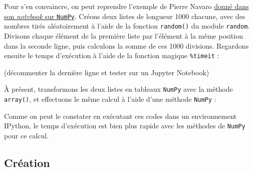 \documentclass[12pt,]{book}
\newenvironment{Shaded}{\begin{snugshade}}{\end{snugshade}}
\newcommand{\KeywordTok}[1]{\textcolor[rgb]{0.13,0.29,0.53}{\textbf{#1}}}
\newcommand{\DecValTok}[1]{\textcolor[rgb]{0.00,0.00,0.81}{#1}}
\newcommand{\ImportTok}[1]{#1}
\newcommand{\CommentTok}[1]{\textcolor[rgb]{0.56,0.35,0.01}{\textit{#1}}}
\newcommand{\ControlFlowTok}[1]{\textcolor[rgb]{0.13,0.29,0.53}{\textbf{#1}}}
\newcommand{\OperatorTok}[1]{\textcolor[rgb]{0.81,0.36,0.00}{\textbf{#1}}}
\newcommand{\BuiltInTok}[1]{#1}
\newcommand{\NormalTok}[1]{#1}
\numberwithin{equation}{section}
\numberwithin{countremarque}{section}
\begin{document}
Pour s'en convaincre, on peut reprendre l'exemple de Pierre Navaro
\href{https://github.com/pnavaro/python-notebooks/blob/master/13.Numpy.ipynb}{donné
dans son \emph{notebook} sur \texttt{NumPy}}. Créons deux listes de
longueur 1000 chacune, avec des nombres tirés aléatoirement à l'aide de
la fonction \texttt{random()} du module \texttt{random}. Divisons chaque
élément de la première liste par l'élément à la même position dans la
seconde ligne, puis calculons la somme de ces 1000 divisions. Regardons
ensuite le temps d'exécution à l'aide de la fonction magique
\texttt{\%timeit} :

\begin{Shaded}
\end{Shaded}

(décommenter la dernière ligne et tester sur un Jupyter Notebook)

À présent, transformons les deux listes en tableaux \texttt{NumPy} avec
la méthode \texttt{array()}, et effectuons le même calcul à l'aide d'une
méthode \texttt{NumPy} :

\begin{Shaded}
\end{Shaded}

Comme on peut le constater en exécutant ces codes dans un environnement
IPython, le temps d'exécution est bien plus rapide avec les méthodes de
\texttt{NumPy} pour ce calcul.

\subsection{Création}\label{creation}
\end{document}
